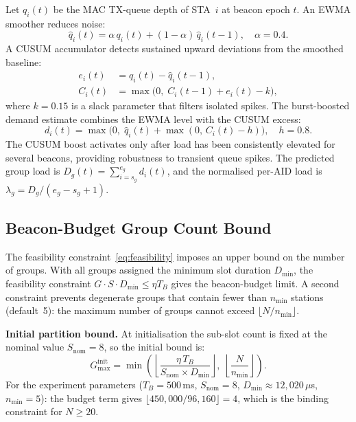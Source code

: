 \documentclass[conference]{IEEEtran}
\begin{document}
Let $q_i(t)$ be the MAC TX-queue depth of STA~$i$ at beacon epoch $t$.
An EWMA smoother reduces noise:
\begin{equation}
  \hat{q}_i(t) = \alpha\,q_i(t) + (1-\alpha)\,\hat{q}_i(t-1),
  \quad \alpha = 0.4.
  \label{eq:ewma}
\end{equation}
A CUSUM accumulator detects sustained upward deviations from the smoothed
baseline:
\begin{align}
  e_i(t)   &= q_i(t) - \hat{q}_i(t-1), \label{eq:err}\\
  C_i(t)   &= \max\!\bigl(0,\;C_i(t-1)+e_i(t)-k\bigr),
  \label{eq:cusum}
\end{align}
where $k\!=\!0.15$ is a slack parameter that filters isolated spikes.
The burst-boosted demand estimate combines the EWMA level with the CUSUM
excess:
\begin{equation}
  d_i(t) = \max\!\bigl(0,\;\hat{q}_i(t)+\max(0,\,C_i(t)-h)\bigr),
  \quad h = 0.8.
  \label{eq:demand}
\end{equation}
The CUSUM boost activates only after load has been consistently elevated
for several beacons, providing robustness to transient queue spikes.
The predicted group load is $D_g(t)=\sum_{i=s_g}^{e_g}d_i(t)$, and
the normalised per-AID load is $\lambda_g = D_g/(e_g-s_g+1)$.

\subsection{Beacon-Budget Group Count Bound}
\label{sec:budget}

The feasibility constraint~\eqref{eq:feasibility} imposes an upper bound
on the number of groups.
With all groups assigned the minimum slot duration $D_\mathrm{min}$, the
feasibility constraint $G \cdot S \cdot D_\mathrm{min} \leq \eta T_B$ gives
the beacon-budget limit.  A second constraint prevents degenerate groups
that contain fewer than $n_\mathrm{min}$ stations (default~5): the
maximum number of groups cannot exceed $\lfloor N/n_\mathrm{min}\rfloor$.

\textbf{Initial partition bound.}
At initialisation the sub-slot count is fixed at the nominal value
$S_\mathrm{nom}\!=\!8$, so the initial bound is:
\begin{equation}
  G_\mathrm{max}^\mathrm{init} = \min\!\left(
    \left\lfloor\frac{\eta\,T_B}{S_\mathrm{nom} \times D_\mathrm{min}}\right\rfloor,\;
    \left\lfloor\frac{N}{n_\mathrm{min}}\right\rfloor
  \right).
  \label{eq:gmax_init}
\end{equation}
For the experiment parameters ($T_B\!=\!500$\,ms, $S_\mathrm{nom}\!=\!8$,
$D_\mathrm{min}\!\approx\!12{,}020\,\mu$s, $n_\mathrm{min}\!=\!5$):
the budget term gives $\lfloor 450{,}000/96{,}160\rfloor\!=\!4$, which is
the binding constraint for $N\!\geq\!20$.
\end{document}
